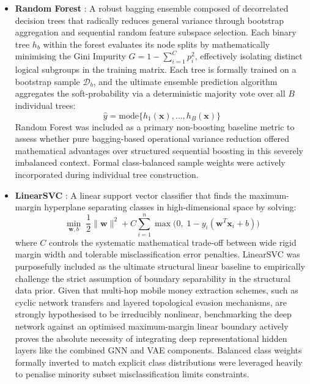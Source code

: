 \documentclass[a4paper,fleqn]{cas-sc}
\begin{document}
\begin{itemize}
    \item \textbf{Random Forest} \cite{Breiman2001RandomForests}: A robust bagging ensemble composed of decorrelated decision trees that radically reduces general variance through bootstrap aggregation and sequential random feature subspace selection. Each binary tree $h_b$ within the forest evaluates its node splits by mathematically minimising the Gini Impurity $G = 1 - \sum_{i=1}^{C} p_i^2$, effectively isolating distinct logical subgroups in the training matrix. Each tree is formally trained on a bootstrap sample $\mathcal{D}_b$, and the ultimate ensemble prediction algorithm aggregates the soft-probability via a deterministic majority vote over all $B$ individual trees:
    \begin{equation}
    \hat{y} = \text{mode}\{h_1(\mathbf{x}), \ldots, h_B(\mathbf{x})\}
    \label{eq:rf_pred}
    \end{equation}
    Random Forest was included as a primary non-boosting baseline metric to assess whether pure bagging-based operational variance reduction offered mathematical advantages over structured sequential boosting in this severely imbalanced context. Formal class-balanced sample weights were actively incorporated during individual tree construction.

    \item \textbf{LinearSVC} \cite{Cortes1995SupportVector}: A linear support vector classifier that finds the maximum-margin hyperplane separating classes in high-dimensional space by solving:
    \begin{equation}
    \min_{\mathbf{w}, b} \;\frac{1}{2}\|\mathbf{w}\|^2 + C\sum_{i=1}^{n}\max\bigl(0,\; 1 - y_i(\mathbf{w}^T\mathbf{x}_i + b)\bigr)
    \label{eq:svm}
    \end{equation}
    where $C$ controls the systematic mathematical trade-off between wide rigid margin width and tolerable misclassification error penalties. LinearSVC was purposefully included as the ultimate structural linear baseline to empirically challenge the strict assumption of boundary separability in the structural data prior. Given that multi-hop mobile money extraction schemes, such as cyclic network transfers and layered topological evasion mechanisms, are strongly hypothesised to be irreducibly nonlinear, benchmarking the deep network against an optimised maximum-margin linear boundary actively proves the absolute necessity of integrating deep representational hidden layers like the combined GNN and VAE components. Balanced class weights formally inverted to match explicit class distributions were leveraged heavily to penalise minority subset misclassification limits constraints.
\end{itemize}
\end{document}
